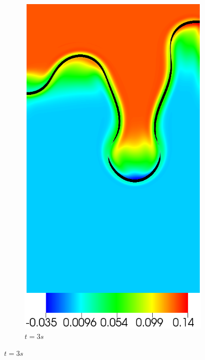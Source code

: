 \begin{figure}[H]
\begin{subfigure}[ht!]{0.2\textwidth}
		\includegraphics[width=1\textwidth]{figure/PT_RT/concent0/visit0010.png}
		\caption{$t=3s$}
	\end{subfigure}
\end{figure}\vspace{-0.8cm}
